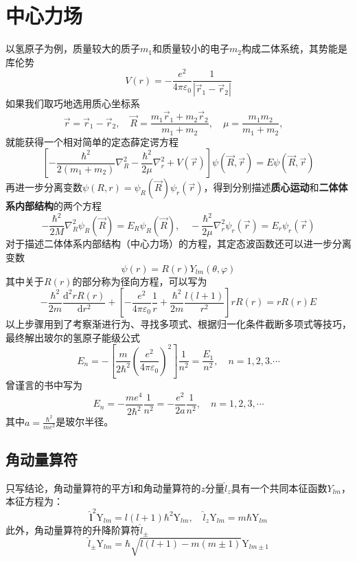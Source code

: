 \section{中心力场}
以氢原子为例，质量较大的质子$m_1$和质量较小的电子$m_2$构成二体系统，其势能是库伦势
$$
    V(r)=-\frac{e^2}{4\pi\varepsilon_0}\frac{1}{|\vec{r}_1-\vec{r}_2|}
$$
如果我们取巧地选用质心坐标系
$$
    \vec{r}=\vec{r}_1-\vec{r}_2, \quad
    \vec{R}=\frac{m_1\vec{r}_1+m_2\vec{r}_2}{m_1+m_2}, \quad
    \mu=\frac{m_1m_2}{m_1+m_2}, \quad
$$
就能获得一个相对简单的定态薛定谔方程
$$
    \left[-\frac{\hbar^2}{2(m_1+m_2)}\nabla_R^2-\frac{\hbar^2}{2\mu}\nabla_r^2+V(\vec{r})\right]\psi(\vec{R}, \vec{r})=E\psi(\vec{R}, \vec{r})
$$
再进一步分离变数$\psi(R, r)=\psi_R(\vec{R})\psi_r(\vec{r})$，得到分别描述\textbf{质心运动}和\textbf{二体体系内部结构}的两个方程
$$
    -\frac{\hbar^2}{2M}\nabla_R^2\psi_R(\vec{R})=E_R\psi_R(\vec{R}), \quad
    -\frac{\hbar^2}{2\mu}\nabla_r^2\psi_r(\vec{r})=E_r\psi_r(\vec{r})
$$
对于描述二体体系内部结构（中心力场）的方程，其定态波函数还可以进一步分离变数
$$
    \psi(r)=R(r)Y_{lm}(\theta, \varphi)
$$
其中关于$R(r)$的部分称为径向方程，可以写为
$$
    -\frac{\hbar^2}{2m}\frac{\mathrm{d}^2rR(r)}{\mathrm{d}r^2}+\left[-\frac{e^2}{4\pi\varepsilon_0}\frac{1}{r}+\frac{\hbar^2}{2m}\frac{l(l+1)}{r^2}\right]rR(r)=rR(r)E
$$
以上步骤用到了考察渐进行为、寻找多项式、根据归一化条件截断多项式等技巧，最终解出玻尔的氢原子能级公式
$$
    E_n=-\left[\frac{m}{2\hbar^2}\left(\frac{e^2}{4\pi\varepsilon_0}\right)^2 \right]\frac{1}{n^2}=\frac{E_1}{n^2}, \quad n=1,2,3.\cdots
$$
曾谨言的书中写为
$$
    \boxed{
        E_n=-\frac{me^4}{2\hbar^2}\frac{1}{n^2}=-\frac{e^2}{2a}\frac{1}{n^2},\quad n=1,2,3,\cdots
    }
$$
其中$a=\frac{\hbar^2}{me^2}$是玻尔半径。


\subsection{角动量算符}
只写结论，角动量算符的平方$\hat{\boldsymbol{l}}$和角动量算符的$z$分量$\hat{l}_z$具有一个共同本征函数$Y_{lm}$，本征方程为：
$$
    \hat{\boldsymbol{l}}^2\mathrm{Y}_{lm}=l(l+1)\hbar^2\mathrm{Y}_{lm}, \quad
    \hat{l}_z\mathrm{Y}_{lm}=m\hbar\mathrm{Y}_{lm}
$$
此外，角动量算符的升降阶算符$\hat{l}_{\pm}$
$$
    \hat{l}_{\pm}\mathrm{Y}_{lm}=\hbar\sqrt{l(l+1)-m(m \pm 1)}\mathrm{Y}_{lm \pm 1}
$$


